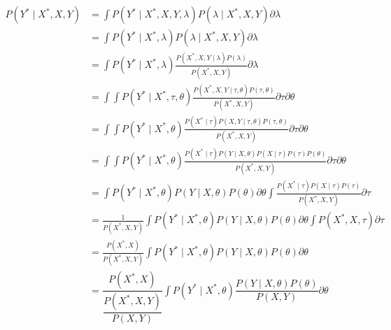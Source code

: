 \documentclass{article}
\begin{document}
\begin{equation}
\label{eq:discriminative-prediction}
\begin{aligned}
P \left( Y^{*} \mid X^{*}, X, Y \right) &= \int P \left( Y^{*} \mid X^{*}, X, Y, \lambda \right) P \left( \lambda \mid X^{*}, X, Y \right) \partial \lambda\\
&= \int P \left( Y^{*} \mid X^{*}, \lambda \right) P \left( \lambda \mid X^{*}, X, Y \right) \partial \lambda\\
&= \int P \left( Y^{*} \mid X^{*}, \lambda \right) \frac{P \left( X^{*}, X, Y \mid \lambda \right) P \left( \lambda \right)}{P \left( X^{*}, X, Y \right)} \partial \lambda\\
&= \int \int P \left( Y^{*} \mid X^{*}, \tau, \theta \right) \frac{P \left( X^{*}, X, Y \mid \tau, \theta \right) P \left( \tau, \theta \right)}{P \left( X^{*}, X, Y \right)} \partial \tau \partial \theta\\
&= \int \int P \left( Y^{*} \mid X^{*}, \theta \right) \frac{P \left( X^{*} \mid \tau \right) P\left( X, Y \mid \tau, \theta \right) P \left( \tau, \theta \right)}{P \left( X^{*}, X, Y \right)} \partial \tau \partial \theta\\
&= \int \int P \left( Y^{*} \mid X^{*}, \theta \right) \frac{P \left( X^{*} \mid \tau \right) P \left( Y \mid X, \theta \right) P\left( X \mid \tau \right) P \left( \tau \right) P\left( \theta \right)}{P \left( X^{*}, X, Y \right)} \partial \tau \partial \theta\\
&= \int P \left( Y^{*} \mid X^{*}, \theta \right) P \left( Y \mid X, \theta \right) P\left( \theta \right) \partial \theta \int \frac{P \left( X^{*} \mid \tau \right) P\left( X \mid \tau \right) P \left( \tau \right)}{P \left( X^{*}, X, Y \right)} \partial \tau\\
&= \frac{1}{P \left( X^{*}, X, Y \right)} \int P \left( Y^{*} \mid X^{*}, \theta \right) P \left( Y \mid X, \theta \right) P\left( \theta \right) \partial \theta \int P \left( X^{*}, X, \tau \right) \partial \tau\\
&= \frac{P \left( X^{*}, X \right)}{P \left( X^{*}, X, Y \right)} \int P \left( Y^{*} \mid X^{*}, \theta \right) P \left( Y \mid X, \theta \right) P\left( \theta \right) \partial \theta \\
&= \dfrac{P \left( X^{*}, X \right)}{\dfrac{P \left( X^{*}, X, Y \right)}{P \left( X, Y \right)}} \int P \left( Y^{*} \mid X^{*}, \theta \right) \dfrac{P \left( Y \mid X, \theta \right) P\left( \theta \right)}{P \left( X, Y \right)} \partial \theta\\

\end{aligned}
\end{equation}
\end{document}
